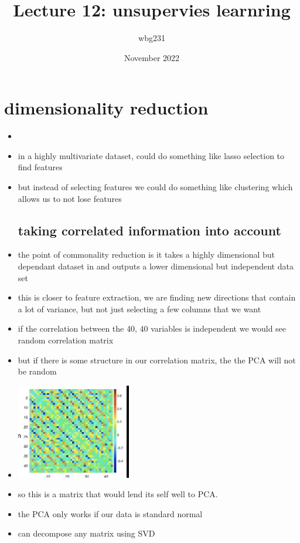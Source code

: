 \documentclass{article}
\title{Lecture 12: unsupervies learnring }
\author{wbg231 }
\date{November 2022}
\begin{document}
\maketitle

\section{dimensionality reduction}
\begin{itemize}
\item 
\item in a highly multivariate dataset, could do something like lasso selection to find features
\item but instead of selecting features we could do something like clustering which allows us to not lose features 
\subsection{taking correlated information into account}
\item the point of commonality reduction is it takes a highly dimensional but dependant dataset in and outputs a lower dimensional but independent data set 
\item this is closer to feature extraction, we are finding new directions that contain a lot of variance, but not just selecting a few columns that we want 
\item if the correlation between the 40, 40 variables is independent we would see random correlation matrix 
\item but if there is some structure in our correlation matrix, the the PCA will not be random 
\item\includegraphics[width=5cm]{Final_Review/lecture_12/corealtion .jpg}
\item so this is a matrix that would lend its self well to PCA. 
\item the PCA only works if our data is standard normal 
\item can decompose any matrix using SVD

\end{itemize}
\end{document}
